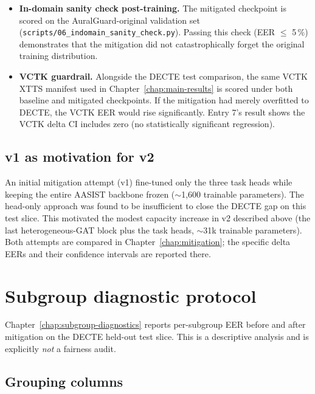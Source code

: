 \begin{itemize}
    \item \textbf{In-domain sanity check post-training.} The mitigated
        checkpoint is scored on the AuralGuard-original validation set
        (\texttt{scripts/}\allowbreak\texttt{06\_indomain\_sanity\_check.py}). Passing this check
        (EER $\leq$ 5\,\%) demonstrates that the mitigation did not
        catastrophically forget the original training distribution.
    \item \textbf{VCTK guardrail.} Alongside the DECTE test comparison, the
        same VCTK XTTS manifest used in Chapter~\ref{chap:main-results} is scored under both
        baseline and mitigated checkpoints. If the mitigation had merely
        overfitted to DECTE, the VCTK EER would rise significantly.
        Entry 7's result shows the VCTK delta CI includes zero (no
        statistically significant regression).
\end{itemize}

\subsection{v1 as motivation for v2}
\label{sec:methodology-mitigation-v1motivation}

An initial mitigation attempt (v1) fine-tuned only the three task
heads while keeping the entire AASIST backbone frozen ($\sim$1,600
trainable parameters). The head-only approach was found to be
insufficient to close the DECTE gap on this test slice. This
motivated the modest capacity increase in v2 described above (the
last heterogeneous-GAT block plus the task heads, $\sim$31k
trainable parameters). Both attempts are compared in
Chapter~\ref{chap:mitigation}; the specific delta EERs and their
confidence intervals are reported there.


\section{Subgroup diagnostic protocol}
\label{sec:methodology-subgroups}

Chapter~\ref{chap:subgroup-diagnostics} reports per-subgroup EER
before and after mitigation on the DECTE held-out test slice. This
is a descriptive analysis and is explicitly \emph{not} a fairness
audit.

\subsection{Grouping columns}
\label{sec:methodology-subgroups-columns}


